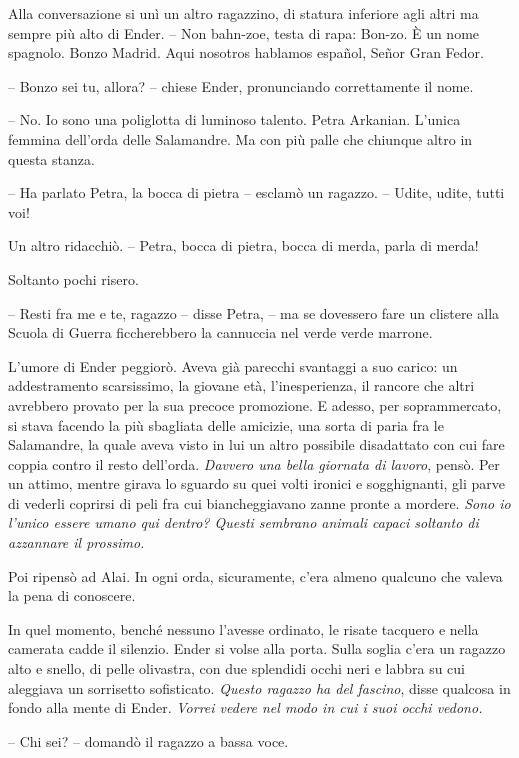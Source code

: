 {Alla conversazione si unì un altro ragazzino, di statura inferiore agli
	altri ma sempre più alto di Ender. -- Non bahn-zoe, testa di rapa:
	Bon-zo. È un nome spagnolo. Bonzo Madrid. Aqui nosotros hablamos
	español, Señor Gran Fedor.}

{-- Bonzo sei tu, allora? -- chiese Ender, pronunciando correttamente il
	nome.}

{-- No. Io sono una poliglotta di luminoso talento. Petra Arkanian.
	L'unica femmina dell'orda delle Salamandre. Ma con più palle che
	chiunque altro in questa stanza.}

{-- Ha parlato Petra, la bocca di pietra -- esclamò un ragazzo. --
	Udite, udite, tutti voi!}

{Un altro ridacchiò. -- Petra, bocca di pietra, bocca di merda, parla di
	merda!}

{Soltanto pochi risero.}

{-- Resti fra me e te, ragazzo -- disse Petra, -- ma se dovessero fare
	un clistere alla Scuola di Guerra ficcherebbero la cannuccia nel verde
	verde marrone.}

{L'umore di Ender peggiorò. Aveva già parecchi svantaggi a suo carico:
	un addestramento scarsissimo, la giovane età, l'inesperienza, il rancore
	che altri avrebbero provato per la sua precoce promozione. E adesso, per
	soprammercato, si stava facendo la più sbagliata delle amicizie, una
	sorta di paria fra le Salamandre, la quale aveva visto in lui un altro
	possibile disadattato con cui fare coppia contro il resto dell'orda.
	\emph{Davvero una bella giornata di lavoro}, \emph{} pensò. Per un
	attimo, mentre girava lo sguardo su quei volti ironici e sogghignanti,
	gli parve di vederli coprirsi di peli fra cui biancheggiavano zanne
	pronte a mordere. \emph{Sono io l'unico essere umano qui dentro? Questi
		sembrano animali capaci soltanto di azzannare il prossimo.}}

{Poi ripensò ad Alai. In ogni orda, sicuramente, c'era almeno qualcuno
	che valeva la pena di conoscere.}

{In quel momento, benché nessuno l'avesse ordinato, le risate tacquero e
	nella camerata cadde il silenzio. Ender si volse alla porta. Sulla
	soglia c'era un ragazzo alto e snello, di pelle olivastra, con due
	splendidi occhi neri e labbra su cui aleggiava un sorrisetto
	sofisticato. \emph{Questo ragazzo ha del fascino}, \emph{} disse
	qualcosa in fondo alla mente di Ender. \emph{Vorrei vedere nel modo in
		cui i suoi occhi vedono.}}

{-- Chi sei? -- domandò il ragazzo a bassa voce.}

